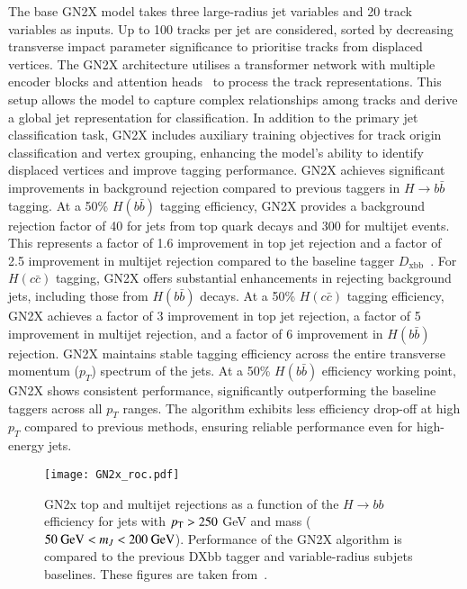             The base GN2X model takes three large-radius jet variables and 20 track variables as inputs. Up to 100 tracks per 
            jet are considered, sorted by decreasing transverse impact parameter significance to prioritise tracks from displaced vertices.
            The GN2X architecture utilises a transformer network with multiple encoder blocks and attention 
            heads~\cite{shleifer2021normformerimprovedtransformerpretraining, ba2016layernormalization} to process the track 
            representations. This setup allows the model to capture complex relationships among tracks and derive a global jet representation for classification.
            In addition to the primary jet classification task, GN2X includes auxiliary training objectives for track origin 
            classification and vertex grouping, enhancing the model's ability to identify displaced vertices and improve tagging performance.
            GN2X achieves significant improvements in background rejection compared to previous taggers in \(H \to b\bar{b}\) tagging. At a 
            50\% \(H(b\bar{b})\) tagging efficiency, GN2X provides a background rejection factor of 40 for jets from top quark decays and 300 
            for multijet events. This represents a factor of 1.6 improvement in top jet rejection and a factor of 2.5 improvement in multijet 
            rejection compared to the baseline tagger $D_\mathrm{xbb}$~\cite{FTAG-2019-07}.
            For \(H(c\bar{c})\) tagging, GN2X offers substantial enhancements in rejecting background jets, including those from \(H(b\bar{b})\) 
            decays. At a 50\% \(H(c\bar{c})\) tagging efficiency, GN2X achieves a factor of 3 improvement in top jet rejection, 
            a factor of 5 improvement in multijet rejection, and a factor of 6 improvement in \(H(b\bar{b})\) rejection.
            GN2X maintains stable tagging efficiency across the entire transverse momentum (\(p_T\)) spectrum of the jets. At a 50\% 
            \(H(b\bar{b})\) efficiency working point, GN2X shows consistent performance, significantly outperforming the baseline taggers 
            across all \(p_T\) ranges. The algorithm exhibits less efficiency drop-off at high \(p_T\) compared to previous methods, 
            ensuring reliable performance even for high-energy jets.
            \begin{figure}[htbp]
                \centering
                \texttt{[image: GN2x\_roc.pdf]}
                \caption{
                    GN2x top and multijet rejections as a function of the $H\rightarrow bb$ efficiency for jets with $p_{\text{T}}>250$ GeV and mass ($50~\text{GeV} < m_J < 200~\text{GeV}$). 
                    Performance of the GN2X algorithm is compared to the previous DXbb tagger and variable-radius subjets baselines.
                    These figures are taken from~\cite{ATL-PHYS-PUB-2023-021}.
                }
                \label{fig:GN2x_roc}
            \end{figure}


